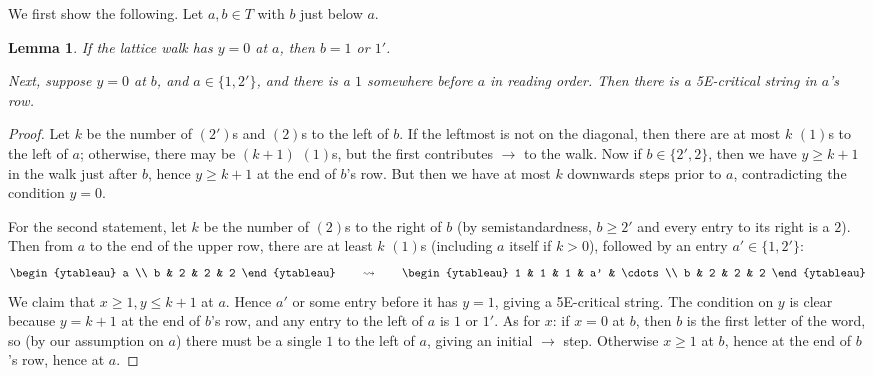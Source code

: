 \documentclass[10pt]{amsart}
\newtheorem{lemma}[theorem]{Lemma}
\theoremstyle{definition}
\newcommand{\east}[1]{\ensuremath{\xrightarrow{\ #1\ }}}
\begin{document}
We first show the following. Let $a,b \in T$ with $b$ just below $a$.

\begin{lemma} \label{lem:special-ssyt-cases}
If the lattice walk has $y=0$ at $a$, then $b=1$ or $1'$.

Next, suppose $y=0$ at $b$, and $a \in \{1,2'\}$, and there is a $1$ somewhere before $a$ in reading order. Then there is a 5E-critical string in $a$'s row.
\end{lemma}

\begin{proof}
Let $k$ be the number of $(2')$s and $(2)$s to the left of $b$. If the leftmost is not on the diagonal, then there are at most $k$ $(1)$s to the left of $a$; otherwise, there may be $(k+1)$ $(1)$s, but the first contributes $\east{}$ to the walk. Now if $b \in \{2',2\}$, then we have $y \geq k+1$ in the walk just after $b$, hence $y \geq k+1$ at the end of $b$'s row. But then we have at most $k$ downwards steps prior to $a$, contradicting the condition $y=0$.

For the second statement, let $k$ be the number of $(2)$s to the right of $b$ (by semistandardness, $b \geq 2'$ and every entry to its right is a $2$). Then from $a$ to the end of the upper row, there are at least $k$ $(1)$s (including $a$ itself if $k>0$), followed by an entry $a' \in \{1,2'\}$:
\[
\begin{ytableau}
a \\
b & 2 & 2 & 2
\end{ytableau} \qquad \leadsto \qquad 
\begin{ytableau}
1 & 1 & 1 & a' & \cdots \\
b & 2 & 2 & 2
\end{ytableau}
\]
We claim that $x \geq 1, y \leq k+1$ at $a$. Hence $a'$ or some entry before it has $y=1$, giving a 5E-critical string. The condition on $y$ is clear because $y=k+1$ at the end of $b$'s row, and any entry to the left of $a$ is $1$ or $1'$. As for $x$: if $x=0$ at $b$, then $b$ is the first letter of the word, so (by our assumption on $a$) there must be a single $1$ to the left of $a$, giving an initial $\east{}$ step. Otherwise $x \geq 1$ at $b$, hence at the end of $b$'s row, hence at $a$.
\end{proof}
\end{document}
